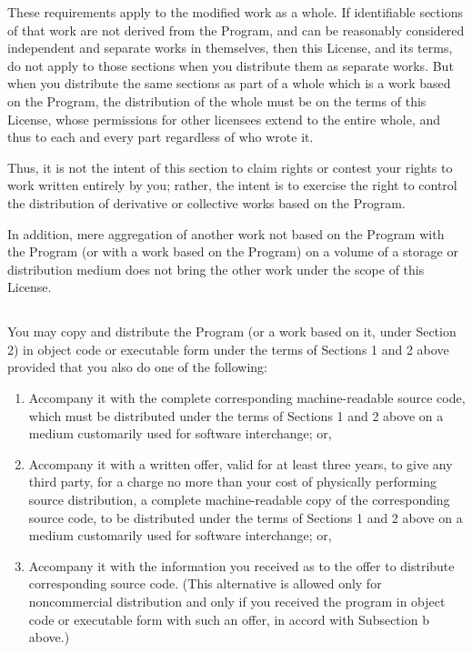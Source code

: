 \documentclass[a4paper, 12pt]{article}
\begin{document}
\vspace{0.3cm}

These requirements apply to the modified work as a whole. If identifiable sections of that work are not derived from the Program, and can be reasonably considered independent and separate works in themselves, then this License, and its terms, do not apply to those sections when you distribute them as separate works. But when you distribute the same sections as part of a whole which is a work based on the Program, the distribution of the whole must be on the terms of this License, whose permissions for other licensees extend to the entire whole, and thus to each and every part regardless of who wrote it.

\vspace{0.3cm}

Thus, it is not the intent of this section to claim rights or contest your rights to work written entirely by you; rather, the intent is to exercise the right to control the distribution of derivative or collective works based on the Program.

\vspace{0.3cm}

In addition, mere aggregation of another work not based on the Program with the Program (or with a work based on the Program) on a volume of a storage or distribution medium does not bring the other work under the scope of this License.

\subsection{}

You may copy and distribute the Program (or a work based on it, under Section 2) in object code or executable form under the terms of Sections 1 and 2 above provided that you also do one of the following:

\begin{enumerate}[label=\alph*)]
\item Accompany it with the complete corresponding machine-readable source code, which must be distributed under the terms of Sections 1 and 2 above on a medium customarily used for software interchange; or,
\item Accompany it with a written offer, valid for at least three years, to give any third party, for a charge no more than your cost of physically performing source distribution, a complete machine-readable copy of the corresponding source code, to be distributed under the terms of Sections 1 and 2 above on a medium customarily used for software interchange; or,
\item Accompany it with the information you received as to the offer to distribute corresponding source code. (This alternative is allowed only for noncommercial distribution and only if you received the program in object code or executable form with such an offer, in accord with Subsection b above.)
\end{enumerate}
\end{document}
